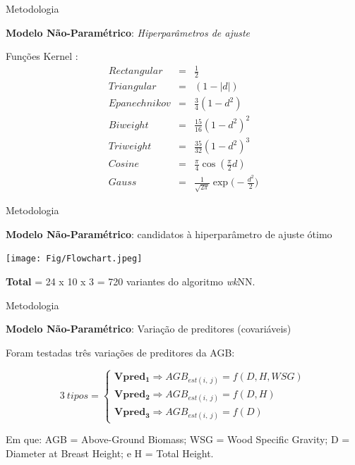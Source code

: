 \documentclass[12pt,ignorenonframetext,aspectratio=1610]{beamer}
\begin{document}
\transwipe
\begin{frame}[t]{Metodologia}
	
	\textbf{Modelo Não-Paramétrico}: \textit{Hiperparâmetros de ajuste} \newline
	
	Funções Kernel \cite{hechenbichler2004weighted}:
	\begin{eqnarray}
	Rectangular &=& \frac{1}{2} \\
	Triangular &=& (1-|d|) \\
	Epanechnikov &=& \frac{3}{4}(1-d^2) \\
	Biweight &=& \frac{15}{16}(1-d^2)^2 \\
	Triweight &=& \frac{35}{32}(1-d^2)^3 \\
	Cosine &=& \frac{\pi}{4}\cos(\frac{\pi}{2}d) \\
	Gauss &=& \frac{1}{\sqrt{2 \pi}}\exp\Bigg(-\frac{d^2}{2}\Bigg)
	\end{eqnarray}
\end{frame}

\transwipe
\begin{frame}[t]{Metodologia}

\textbf{Modelo Não-Paramétrico}: candidatos à hiperparâmetro de ajuste ótimo 

	\begin{center}
	\texttt{[image: Fig/Flowchart.jpeg]}
	\end{center}
	
\textbf{Total} = 24 x 10 x 3 = 720 variantes do algoritmo \textit{wk}NN.

\end{frame}

\transwipe
\begin{frame}[t]{Metodologia}
	
\textbf{Modelo Não-Paramétrico}: Variação de preditores (covariáveis) \newline

Foram testadas três variações de preditores da AGB: \newline
	
		\[
		3\ tipos =\begin{cases}
		\boldsymbol{Vpred_1} \Longrightarrow	{AGB_{est(i,\ j)}} = f(D, H, WSG) \\
		\boldsymbol{Vpred_2} \Longrightarrow	{AGB_{est(i,\ j)}} = f(D, H) \\
		\boldsymbol{Vpred_3} \Longrightarrow	{AGB_{est(i,\ j)}} = f(D)
		\end{cases}
		\] \newline
		
Em que: AGB = Above-Ground Biomass; WSG = Wood Specific Gravity; D = Diameter at Breast Height; e H = Total Height.

\end{frame}
\end{document}
